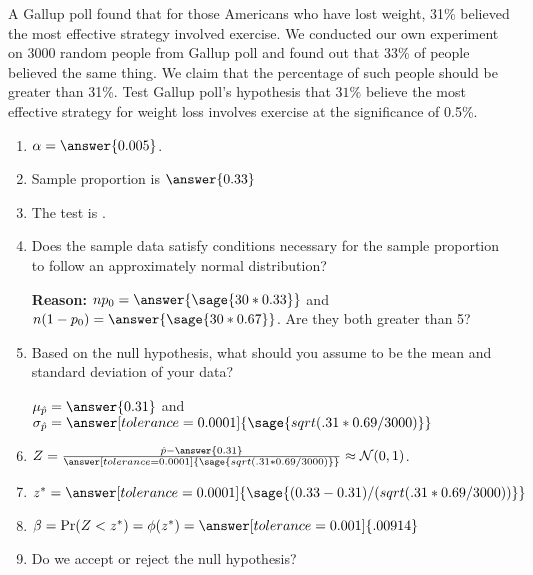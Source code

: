 \documentclass{ximera}
\begin{document}
\begin{problem}
A Gallup poll found that for those Americans who have lost weight, 31\% believed the most
effective strategy involved exercise. We conducted our own experiment on 3000 random people from Gallup poll and found out that 33\% of people believed the same thing. We claim that the percentage of such people should be greater than 31\%. Test Gallup poll's hypothesis that $31\%$ believe the most effective strategy for weight loss involves exercise at the significance of 0.5\%.

\begin{explanation}

\begin{enumerate}
    \item $\alpha=\answer{0.005}$.
    \item Sample proportion is $\answer{0.33}$
     \item The test is .
    \item Does the sample data satisfy conditions necessary for the sample proportion to follow an
approximately normal distribution?
\begin{multipleChoice}
\end{multipleChoice}
{\bf Reason:} $np_0=\answer{\sage{30*0.33}}$
and $n(1-p_0)=\answer{\sage{30*0.67}}$. Are they both greater than 5? 
    
    \item Based on the null hypothesis, what should you assume to be the mean and standard deviation of your data? 

$\mu_{\hat p}=\answer{0.31}$ and $\sigma_{\hat p}=\answer[tolerance=0.0001]{\sage{sqrt(.31*0.69/3000)}}$
    \item $Z=\frac{\hat p -\answer{0.31}}{\answer[tolerance=0.0001]{\sage{sqrt(.31*0.69/3000)}}}\approx \mathcal N(0,1)$.
    \item $z^*=\answer[tolerance=0.0001]{\sage{(0.33 -0.31)/(sqrt(.31*0.69/3000))}}$
    \item $\beta=\Pr(Z<z^*)=\phi(z^*)=\answer[tolerance=0.001]{.00914}$
    \item Do we accept or reject the null hypothesis?
    \begin{multipleChoice}
    \end{multipleChoice}
\end{enumerate}
\end{explanation}
\end{problem}
\end{document}
